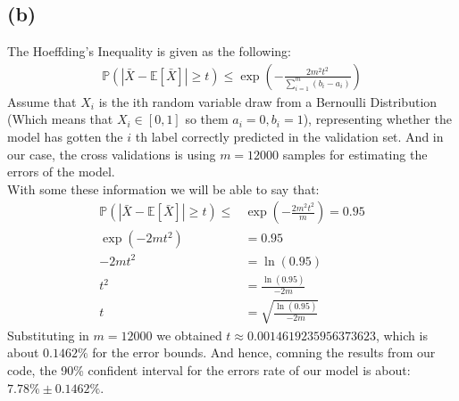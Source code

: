 \documentclass[]{article}
\begin{document}
		\subsection*{(b)}
			The Hoeffding's Inequality is given as the following: 
			\begin{align*}\tag{B.2.1}\label{eqn:B.2.1}
				\mathbb{P}\left(
					\left|
						\bar{X} - 
						\mathbb{E}\left[\bar{X}\right]
					\right|
					\ge t
				\right)
				\le 
				\exp\left(
					-\frac{2m^2t^2}{
						\sum_{i = 1}^{m}(b_i - a_i)
					}
				\right)
			\end{align*}
			Assume that $X_i$ is the ith random variable draw from a Bernoulli Distribution (Which means that $X_i\in[0, 1]$ so them $a_i = 0, b_i = 1$), representing whether the model has gotten the $i$ th label correctly predicted in the validation set.  And in our case, the cross validations is using $m = 12000$ samples for estimating the errors of the model. 
			\\
			With some these information we will be able to say that: 
			\begin{align*}\tag{B.2.2}\label{eqn:B.2.2}
				\mathbb{P}\left(
					\left|
						\bar{X} - 
						\mathbb{E}\left[\bar{X}\right]
					\right|
					\ge t
				\right)
				\le& 
				\exp\left(
					-\frac{2m^2t^2}{
						m
					}
				\right) = 0.95
				\\
				\exp
				\left(
					-2mt^2
				\right)
				&= 0.95
				\\
				-2mt^2 &= \ln(0.95)
				\\
				t^2 &= \frac{\ln(0.95)}{-2m}
				\\
				t &= \sqrt{\frac{\ln(0.95)}{-2m}}
			\end{align*}
			Substituting in $m = 12000$ we obtained $t\approx 0.0014619235956373623$, which is about $0.1462\%$ for the error bounds. And hence, comning the results from our code, the 90\% confident interval for the errors rate of our model is about: $7.78\% \pm 0.1462\%$.  
\end{document}

